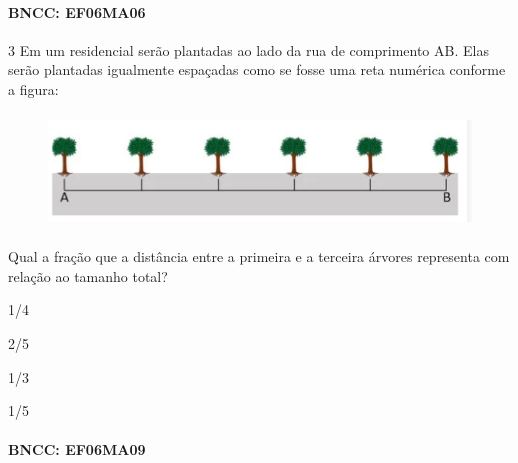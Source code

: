 {\paragraph{BNCC: EF06MA06}


\num{3}  Em um residencial serão plantadas ao lado da rua de comprimento AB.
Elas serão plantadas igualmente espaçadas como se fosse uma reta
numérica conforme a figura:


\begin{figure}
\includegraphics[width=5in,height=1.19792in]{./imgSAEB_6_MAT/media/image109.png}
\end{figure}

Qual a fração que a distância entre a primeira e a terceira árvores
representa com relação ao tamanho total?

\begin{escolha}
\item 1/4
\item 2/5
\item 1/3
\item 1/5
\end{escolha}

\paragraph{BNCC: EF06MA09}

}
